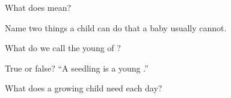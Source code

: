 \begin{exercise}[$\star$]\label{exo:g2:growing:1}
What does  mean?
\end{exercise}

\begin{exercise}[$\star$]\label{exo:g2:growing:2}
Name two things a child can do that a baby usually cannot.
\end{exercise}

\begin{exercise}[$\star$]\label{exo:g2:growing:3}
What do we call the young of ?
\end{exercise}

\begin{exercise}[$\star$]\label{exo:g2:growing:4}
True or false? ``A seedling is a young .''
\end{exercise}

\begin{exercise}[$\star\star$]\label{exo:g2:growing:5}
What does a growing child need each day?
\end{exercise}

